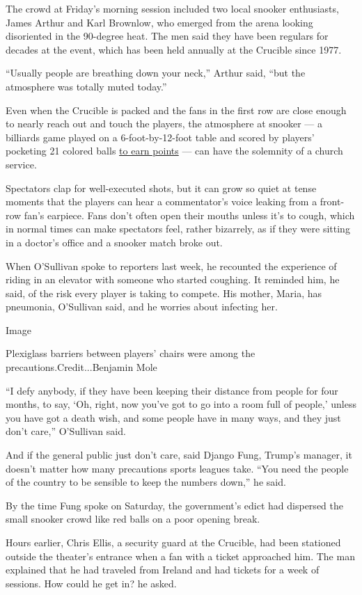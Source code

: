 The crowd at Friday's morning session included two local snooker
enthusiasts, James Arthur and Karl Brownlow, who emerged from the arena
looking disoriented in the 90-degree heat. The men said they have been
regulars for decades at the event, which has been held annually at the
Crucible since 1977.

``Usually people are breathing down your neck,'' Arthur said, ``but the
atmosphere was totally muted today.''

Even when the Crucible is packed and the fans in the first row are close
enough to nearly reach out and touch the players, the atmosphere at
snooker --- a billiards game played on a 6-foot-by-12-foot table and
scored by players' pocketing 21 colored balls
\href{https://www.youtube.com/watch?v=CjSWUTkupQo}{to earn points} ---
can have the solemnity of a church service.

Spectators clap for well-executed shots, but it can grow so quiet at
tense moments that the players can hear a commentator's voice leaking
from a front-row fan's earpiece. Fans don't often open their mouths
unless it's to cough, which in normal times can make spectators feel,
rather bizarrely, as if they were sitting in a doctor's office and a
snooker match broke out.

When O'Sullivan spoke to reporters last week, he recounted the
experience of riding in an elevator with someone who started coughing.
It reminded him, he said, of the risk every player is taking to compete.
His mother, Maria, has pneumonia, O'Sullivan said, and he worries about
infecting her.

Image

Plexiglass barriers between players' chairs were among the
precautions.Credit...Benjamin Mole

``I defy anybody, if they have been keeping their distance from people
for four months, to say, `Oh, right, now you've got to go into a room
full of people,' unless you have got a death wish, and some people have
in many ways, and they just don't care,'' O'Sullivan said.

And if the general public just don't care, said Django Fung, Trump's
manager, it doesn't matter how many precautions sports leagues take.
``You need the people of the country to be sensible to keep the numbers
down,'' he said.

By the time Fung spoke on Saturday, the government's edict had dispersed
the small snooker crowd like red balls on a poor opening break.

Hours earlier, Chris Ellis, a security guard at the Crucible, had been
stationed outside the theater's entrance when a fan with a ticket
approached him. The man explained that he had traveled from Ireland and
had tickets for a week of sessions. How could he get in? he asked.

